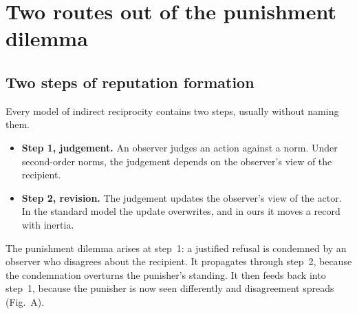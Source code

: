 \documentclass[11pt]{article}
\begin{document}
\section{Two routes out of the punishment dilemma}

\subsection*{Two steps of reputation formation}
Every model of indirect reciprocity contains two steps, usually without naming them.
\begin{itemize}[leftmargin=1.2em]
\item \textbf{Step 1, judgement.} An observer judges an action against a norm. Under second-order norms, the judgement depends on the observer's view of the recipient.
\item \textbf{Step 2, revision.} The judgement updates the observer's view of the actor. In the standard model the update overwrites, and in ours it moves a record with inertia.
\end{itemize}
The punishment dilemma arises at step~1: a justified refusal is condemned by an observer who disagrees about the recipient. It propagates through step~2, because the condemnation overturns the punisher's standing. It then feeds back into step~1, because the punisher is now seen differently and disagreement spreads (Fig.~A).
\end{document}
